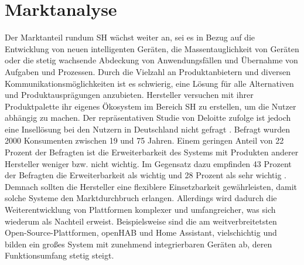\section{Marktanalyse}
\label{sec:marktanalyse}
    Der Marktanteil rundum \acl{SH} wächst weiter an, 
    sei es in Bezug auf die Entwicklung von neuen intelligenten Geräten, die 
    Massentauglichkeit von Geräten 
    oder die stetig wachsende Abdeckung von Anwendungsfällen und Übernahme von Aufgaben und Prozessen. Durch die Vielzahl an 
    Produktanbietern und diversen Kommunikationsmöglichkeiten ist es schwierig, eine Lösung für alle Alternativen und 
    Produktausprägungen anzubieten. Hersteller versuchen mit ihrer Produktpalette ihr eigenes Ökosystem im Bereich 
    \acl{SH} zu erstellen, um die Nutzer abhängig zu machen. Der repräsentativen Studie von Deloitte zufolge ist jedoch eine 
    Insellösung bei den Nutzern in Deutschland nicht gefragt \cite{deloitte2018}. Befragt wurden 2000 Konsumenten zwischen 
    19 und 75 Jahren. Einem geringen Anteil von 22 Prozent der 
    Befragten ist die Erweiterbarkeit des Systems mit Produkten anderer Hersteller weniger bzw. nicht wichtig. Im Gegensatz dazu 
    empfinden 43 Prozent der Befragten die Erweiterbarkeit als wichtig und 28 Prozent als sehr wichtig \cite{deloitte2018}. 
    Demnach sollten die Hersteller eine flexiblere Einsetzbarkeit gewährleisten, damit solche Systeme den Marktdurchbruch 
    erlangen. Allerdings wird dadurch die Weiterentwicklung von Plattformen komplexer und umfangreicher, was sich wiederum als 
    Nachteil erweist. Beispielsweise sind die am weitverbreitetsten Open-Source-Plattformen, openHAB und Home Assistant, 
    vielschichtig und bilden ein großes System mit zunehmend integrierbaren Geräten ab, deren Funktionsumfang stetig steigt. 

